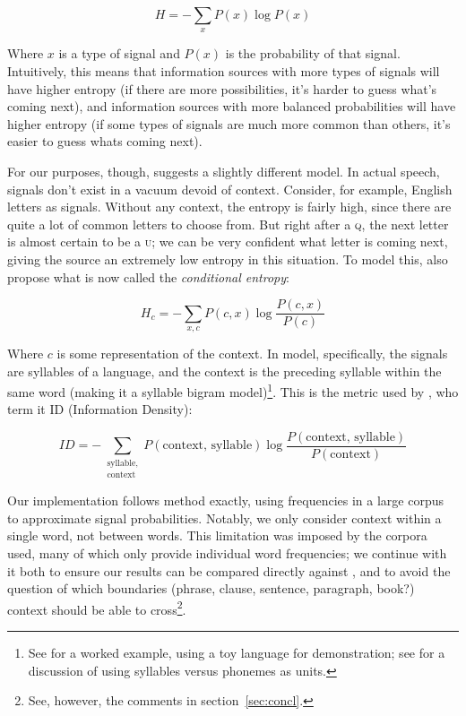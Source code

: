 \documentclass[12pt,twoside]{article}
\begin{document}
\begin{equation}
\label{eqn:shannon}
H = - \sum_x P(x) \log P(x)
\end{equation}

Where \(x\) is a type of signal and \(P(x)\) is the probability of that signal. Intuitively, this means that information sources with more types of signals will have higher entropy (if there are more possibilities, it's harder to guess what's coming next), and information sources with more balanced probabilities will have higher entropy (if some types of signals are much more common than others, it's easier to guess whats coming next).

For our purposes, though, \citet{oh} suggests a slightly different model. In actual speech, signals don't exist in a vacuum devoid of context. Consider, for example, English letters as signals. Without any context, the entropy is fairly high, since there are quite a lot of common letters to choose from. But right after a \textsc{q}, the next letter is almost certain to be a \textsc{u}; we can be very confident what letter is coming next, giving the source an extremely low entropy in this situation. To model this, \citet[52]{shannon} also propose what is now called the \emph{conditional entropy}:

\begin{equation}
H_c = - \sum_{x,c} P(c,x) \log \frac{P(c,x)}{P(c)}
\end{equation}

Where \(c\) is some representation of the context. In  model, specifically, the signals are syllables of a language, and the context is the preceding syllable within the same word (making it a syllable bigram model)\footnote{See \cite[41]{oh} for a worked example, using a toy language for demonstration; see \cite[545]{pellegrino} for a discussion of using syllables versus phonemes as units.}. This is the metric used by \citet{coupé}, who term it ID (Information Density):

\begin{equation}
\label{eq:id}
ID = - \sum_{\substack{\textrm{syllable},\\\textrm{context}}} P(\textrm{context, syllable}) \log \frac{P(\textrm{context, syllable})}{P(\textrm{context})}
\end{equation}

Our implementation follows  method exactly, using frequencies in a large corpus to approximate signal probabilities. Notably, we only consider context within a single word, not between words. This limitation was imposed by the corpora \citet{oh} used, many of which only provide individual word frequencies; we continue with it both to ensure our results can be compared directly against , and to avoid the question of which boundaries (phrase, clause, sentence, paragraph, book?) context should be able to cross\footnote{See, however, the comments in section~\ref{sec:concl}.}.
\end{document}
